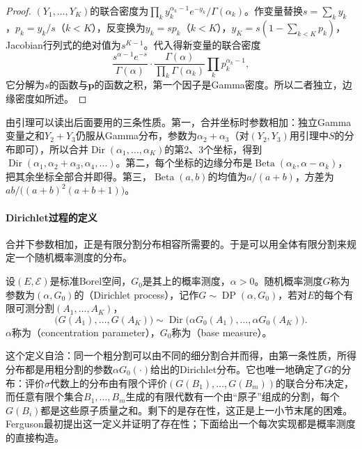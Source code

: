\begin{proof}
$(Y_1,\ldots,Y_K)$的联合密度为$\prod_ky_k^{\alpha_k-1}e^{-y_k}/\Gamma(\alpha_k)$。作变量替换$s=\sum_ky_k$，$p_k=y_k/s$（$k<K$），反变换为$y_k=sp_k$（$k<K$），$y_K=s(1-\sum_{k<K}p_k)$，Jacobian行列式的绝对值为$s^{K-1}$。代入得新变量的联合密度
\[
  \frac{s^{\alpha-1}e^{-s}}{\Gamma(\alpha)}\cdot\frac{\Gamma(\alpha)}{\prod_k\Gamma(\alpha_k)}\prod_kp_k^{\alpha_k-1},
\]
它分解为$s$的函数与$\bm p$的函数之积，第一个因子是Gamma密度。所以二者独立，边缘密度如所述。
\end{proof}

由引理可以读出后面要用的三条性质。第一，合并坐标时参数相加：独立Gamma变量之和$Y_2+Y_3$仍服从Gamma分布，参数为$\alpha_2+\alpha_3$（对$(Y_2,Y_3)$用引理中$S$的分布即可），所以合并$\operatorname{Dir}(\alpha_1,\ldots,\alpha_K)$的第$2$、$3$个坐标，得到$\operatorname{Dir}(\alpha_1,\alpha_2+\alpha_3,\alpha_4,\ldots)$。第二，每个坐标的边缘分布是$\operatorname{Beta}(\alpha_k,\alpha-\alpha_k)$，把其余坐标全部合并即得。第三，$\operatorname{Beta}(a,b)$的均值为$a/(a+b)$，方差为$ab/\bigl((a+b)^2(a+b+1)\bigr)$。

\paragraph{Dirichlet过程的定义}
合并下参数相加，正是有限分割分布相容所需要的。于是可以用全体有限分割来规定一个随机概率测度的分布。

\begin{definition}[Dirichlet过程]
\label{def:spp-dirichlet-process}
设$(E,\mathcal E)$是标准Borel空间，$G_0$是其上的概率测度，$\alpha>0$。随机概率测度$G$称为参数为$(\alpha,G_0)$的（Dirichlet process），记作$G\sim\operatorname{DP}(\alpha,G_0)$，若对$E$的每个有限可测分割$(A_1,\ldots,A_K)$，
\[
  \bigl(G(A_1),\ldots,G(A_K)\bigr)\sim\operatorname{Dir}\bigl(\alpha G_0(A_1),\ldots,\alpha G_0(A_K)\bigr).
\]
$\alpha$称为（concentration parameter），$G_0$称为（base measure）。
\end{definition}

这个定义自洽：同一个粗分割可以由不同的细分割合并而得，由第一条性质，所得分布都是用粗分割的参数$\alpha G_0(\cdot)$给出的Dirichlet分布。它也唯一地确定了$G$的分布：评价$\sigma$代数上的分布由有限个评价$(G(B_1),\ldots,G(B_m))$的联合分布决定，而任意有限个集合$B_1,\ldots,B_m$生成的有限代数有一个由“原子”组成的分割，每个$G(B_i)$都是这些原子质量之和。剩下的是存在性，这正是上一小节末尾的困难。Ferguson最初提出这一定义并证明了存在性；下面给出一个每次实现都是概率测度的直接构造。

